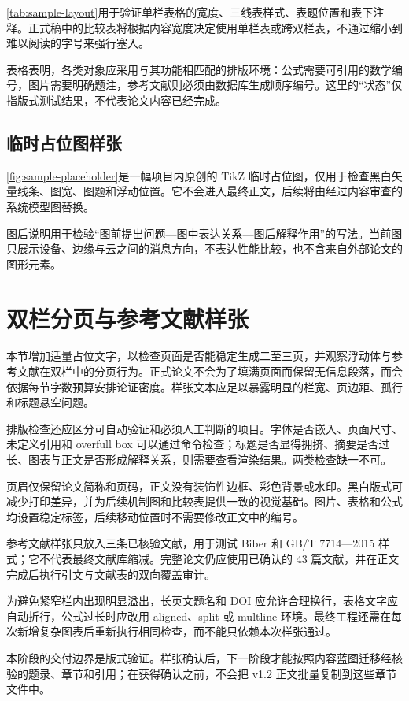 \cref{tab:sample-layout}用于验证单栏表格的宽度、三线表样式、表题位置和表下注释。正式稿中的比较表将根据内容宽度决定使用单栏表或跨双栏表，不通过缩小到难以阅读的字号来强行塞入。



表格表明，各类对象应采用与其功能相匹配的排版环境：公式需要可引用的数学编号，图片需要明确题注，参考文献则必须由数据库生成顺序编号。这里的“状态”仅指版式测试结果，不代表论文内容已经完成。

\subsection{临时占位图样张}\label{subsec:sample-figure}

\cref{fig:sample-placeholder}是一幅项目内原创的 TikZ 临时占位图，仅用于检查黑白矢量线条、图宽、图题和浮动位置。它不会进入最终正文，后续将由经过内容审查的系统模型图替换。



图后说明用于检验“图前提出问题—图中表达关系—图后解释作用”的写法。当前图只展示设备、边缘与云之间的消息方向，不表达性能比较，也不含来自外部论文的图形元素。

\section{双栏分页与参考文献样张}\label{sec:sample-pagination}

本节增加适量占位文字，以检查页面是否能稳定生成二至三页，并观察浮动体与参考文献在双栏中的分页行为。正式论文不会为了填满页面而保留无信息段落，而会依据每节字数预算安排论证密度。样张文本应足以暴露明显的栏宽、页边距、孤行和标题悬空问题。

排版检查还应区分可自动验证和必须人工判断的项目。字体是否嵌入、页面尺寸、未定义引用和 overfull box 可以通过命令检查；标题是否显得拥挤、摘要是否过长、图表与正文是否形成解释关系，则需要查看渲染结果。两类检查缺一不可。

页眉仅保留论文简称和页码，正文没有装饰性边框、彩色背景或水印。黑白版式可减少打印差异，并为后续机制图和比较表提供一致的视觉基础。图片、表格和公式均设置稳定标签，后续移动位置时不需要修改正文中的编号。

参考文献样张只放入三条已核验文献，用于测试 Biber 和 GB/T 7714—2015 样式；它不代表最终文献库缩减。完整论文仍应使用已确认的 43 篇文献，并在正文完成后执行引文与文献表的双向覆盖审计。

为避免紧窄栏内出现明显溢出，长英文题名和 DOI 应允许合理换行，表格文字应自动折行，公式过长时应改用 aligned、split 或 multline 环境。最终工程还需在每次新增复杂图表后重新执行相同检查，而不能只依赖本次样张通过。

本阶段的交付边界是版式验证。样张确认后，下一阶段才能按照内容蓝图迁移经核验的题录、章节和引用；在获得确认之前，不会把 v1.2 正文批量复制到这些章节文件中。
